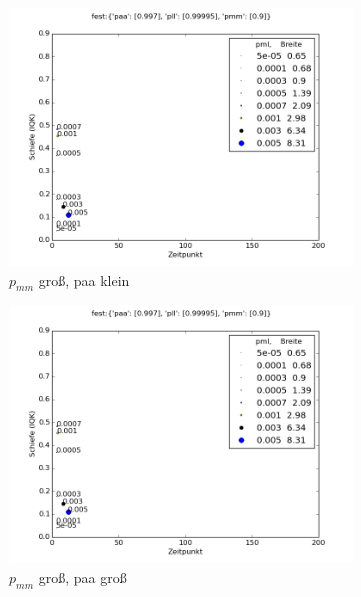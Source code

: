 \begin{figure}
\begin{subfigure}[t]{0.5\textwidth}
\includegraphics[width=\textwidth]{bilder/pml/pml_09_p_0997_099995}
\caption{$p_{mm}$ groß, paa klein}
\end{subfigure}
\begin{subfigure}[t]{0.5\textwidth}
\includegraphics[width=\textwidth]{bilder/pml/pml_09_p_0997_099995}
\caption{$p_{mm}$ groß, paa groß}
\end{subfigure}
\vspace*{7mm}
\begin{subfigure}[b]{0.5\textwidth}

\end{subfigure}
\end{figure}

